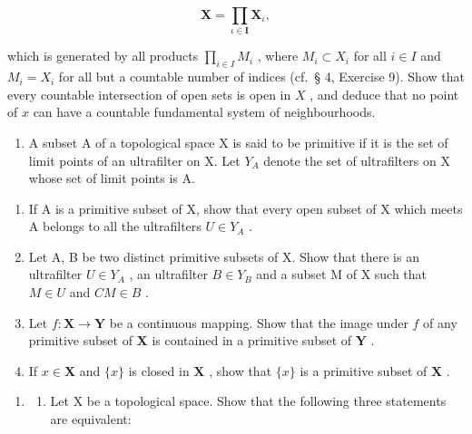 \[
\mathbf {X} = \prod_ {\iota \in \mathbf {I}} \mathbf {X} _ {\iota},
\]

which is generated by all products \(\prod_{i\in I}M_i\) , where \(M_i\subset X_i\) for all \(i\in I\) and \(M_i = X_i\) for all but a countable number of indices (cf.~§ 4, Exercise 9). Show that every countable intersection of open sets is open in \(X\) , and deduce that no point of \(x\) can have a countable fundamental system of neighbourhoods.

\begin{enumerate}
\def\labelenumi{\arabic{enumi})}
\setcounter{enumi}{6}
\tightlist
\item
  A subset A of a topological space X is said to be primitive if it is the set of limit points of an ultrafilter on X. Let \(Y_{A}\) denote the set of ultrafilters on X whose set of limit points is A.
\end{enumerate}

\begin{enumerate}
\def\labelenumi{\alph{enumi})}
\item
  If A is a primitive subset of X, show that every open subset of X which meets A belongs to all the ultrafilters \(U \in Y_{A}\) .
\item
  Let A, B be two distinct primitive subsets of X. Show that there is an ultrafilter \(U \in Y_{A}\) , an ultrafilter \(B \in Y_{B}\) and a subset M of X such that \(M \in U\) and \(CM \in B\) .
\item
  Let \(f: \mathbf{X} \to \mathbf{Y}\) be a continuous mapping. Show that the image under \(f\) of any primitive subset of \(\mathbf{X}\) is contained in a primitive subset of \(\mathbf{Y}\) .
\item
  If \(x \in \mathbf{X}\) and \(\{x\}\) is closed in \(\mathbf{X}\) , show that \(\{x\}\) is a primitive subset of \(\mathbf{X}\) .
\end{enumerate}

\BourbakiExerciseGroup

\begin{enumerate}
\def\labelenumi{\arabic{enumi})}
\tightlist
\item
  \begin{enumerate}
  \def\labelenumii{\alph{enumii})}
  \tightlist
  \item
    Let X be a topological space. Show that the following three statements are equivalent:
  \end{enumerate}
\end{enumerate}

